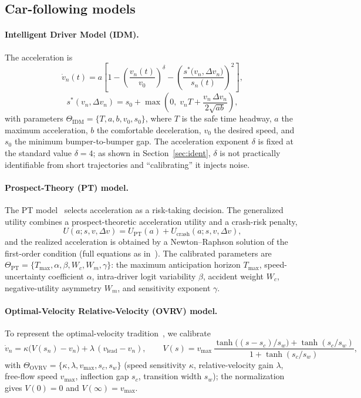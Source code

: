 \documentclass[11pt]{article}
\newcommand{\dv}{\Delta v}
\begin{document}
\subsection{Car-following models}
\paragraph{Intelligent Driver Model (IDM).} The acceleration is
\begin{equation}
\dot v_n(t) = a\!\left[1-\left(\frac{v_n(t)}{v_0}\right)^{\delta}
-\left(\frac{s^\ast\!\big(v_n,\dv_n\big)}{s_n(t)}\right)^{2}\right],
\label{eq:idm}
\end{equation}
\begin{equation}
s^\ast(v_n,\dv_n)=s_0+\max\!\left(0,\;v_n T+\frac{v_n\,\dv_n}{2\sqrt{ab}}\right),
\label{eq:sstar}
\end{equation}
with parameters $\Theta_{\mathrm{IDM}}=\{T,a,b,v_0,s_0\}$, where $T$ is the safe
time headway, $a$ the maximum acceleration, $b$ the comfortable deceleration,
$v_0$ the desired speed, and $s_0$ the minimum bumper-to-bumper gap. The
acceleration exponent $\delta$ is fixed at the standard value $\delta=4$; as
shown in Section~\ref{sec:ident}, $\delta$ is not practically identifiable from
short trajectories and ``calibrating'' it injects noise.

\paragraph{Prospect-Theory (PT) model.} The PT model~\cite{hamdar2008rec,
hamdar2015} selects acceleration as a risk-taking decision. The generalized
utility combines a prospect-theoretic acceleration utility and a crash-risk
penalty,
\begin{equation}
U(a;s,v,\dv)=U_{\mathrm{PT}}(a)+U_{\mathrm{crash}}(a;s,v,\dv),
\end{equation}
and the realized acceleration is obtained by a Newton--Raphson solution of the
first-order condition (full equations as in~\cite{hamdar2015}). The calibrated
parameters are
$\Theta_{\mathrm{PT}}=\{T_{\max},\alpha,\beta,W_c,W_m,\gamma\}$: the maximum
anticipation horizon $T_{\max}$, speed-uncertainty coefficient $\alpha$,
intra-driver logit variability $\beta$, accident weight $W_c$, negative-utility
asymmetry $W_m$, and sensitivity exponent $\gamma$.

\paragraph{Optimal-Velocity Relative-Velocity (OVRV) model.} To represent the
optimal-velocity tradition~\cite{bando1995,jiang2001}, we calibrate
\begin{equation}
\dot v_n = \kappa\big(V(s_n)-v_n\big)+\lambda\,(v_{\mathrm{lead}}-v_n),\qquad
V(s)=v_{\max}\,\frac{\tanh\!\big((s-s_c)/s_w\big)+\tanh(s_c/s_w)}{1+\tanh(s_c/s_w)},
\end{equation}
with $\Theta_{\mathrm{OVRV}}=\{\kappa,\lambda,v_{\max},s_c,s_w\}$ (speed
sensitivity $\kappa$, relative-velocity gain $\lambda$, free-flow speed
$v_{\max}$, inflection gap $s_c$, transition width $s_w$); the normalization gives
$V(0)=0$ and $V(\infty)=v_{\max}$.
\end{document}
